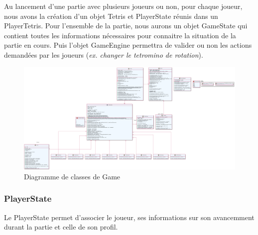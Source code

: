 \documentclass{article}
\begin{document}
Au lancement d'une partie avec plusieurs joueurs ou non, pour chaque joueur, nous avons la création d'un objet Tetris et PlayerState réunis dans un PlayerTetris. Pour l'ensemble de la partie, nous aurons un objet GameState qui contient toutes les informations nécessaires pour connaitre la situation de la partie en cours. Puis l'objet GameEngine permettra de valider ou non les actions demandées par les joueurs (\textit{ex. changer le tetromino de rotation}).

\newpage

\begin{figure}[H]
	\centering
	 \includegraphics[scale=0.2, angle=90]{../../res/uml/class/GameClass.png}
	 \caption{Diagramme de classes de Game}
	 \label{fig:GameClassDiagram}
\end{figure}


\subsubsection*{PlayerState}

Le PlayerState permet d'associer le joueur, ses informations sur son avancemment durant la partie et celle de son profil.
\end{document}
